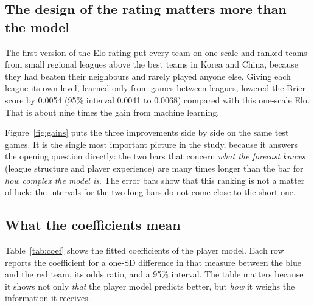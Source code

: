 \documentclass[12pt,a4paper]{article}
\begin{document}
\subsection{The design of the rating matters more than the model}

The first version of the Elo rating put every team on one scale and ranked teams from small regional leagues above the best teams in Korea and China, because they had beaten their neighbours and rarely played anyone else. Giving each league its own level, learned only from games between leagues, lowered the Brier score by 0.0054 (95\% interval 0.0041 to 0.0068) compared with this one-scale Elo. That is about nine times the gain from machine learning.

Figure~\ref{fig:gains} puts the three improvements side by side on the same test games. It is the single most important picture in the study, because it answers the opening question directly: the two bars that concern \emph{what the forecast knows} (league structure and player experience) are many times longer than the bar for \emph{how complex the model is}. The error bars show that this ranking is not a matter of luck: the intervals for the two long bars do not come close to the short one.



\subsection{What the coefficients mean}

Table~\ref{tab:coef} shows the fitted coefficients of the player model. Each row reports the coefficient for a one-SD difference in that measure between the blue and the red team, its odds ratio, and a 95\% interval. The table matters because it shows not only \emph{that} the player model predicts better, but \emph{how} it weighs the information it receives.
\end{document}
